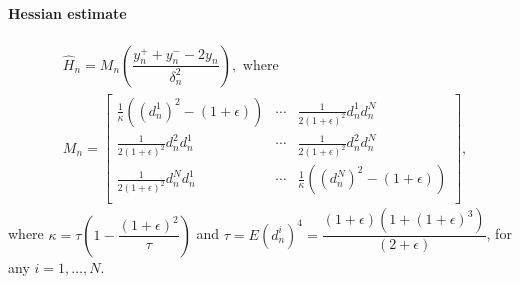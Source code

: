 \documentclass[letterpaper, 10 pt, conference]{ieeeconf}  %
\begin{document}
\paragraph{Hessian estimate}

\begin{align}
\label{eq:2rdsa-estimate-ber}
&\widehat H_n = M_n \left(\dfrac{y_n^+ + y_n^- - 2 y_n}{\delta_n^2}\right), \text{ where }\\
& M_n =
\left[
\begin{array}{ccc}
\frac{1}{\kappa}\left((d_n^1)^2\!-(1+\epsilon)\right) & \cdots & \frac{1}{2(1+\epsilon)^2}d_n^1 d_n^N\\
\frac{1}{2(1+\epsilon)^2}d_n^2 d_n^1  &  \cdots & \frac{1}{2(1+\epsilon)^2}d_n^2 d_n^N\\
\frac{1}{2(1+\epsilon)^2}d_n^N d_n^1 & \cdots &  \frac{1}{\kappa}\left((d_n^N)^2-(1+\epsilon)\right) \\
\end{array}
\right],\nonumber
\end{align}
where $\kappa = \tau \left(1- \dfrac{(1+\epsilon)^2}{\tau}\right)$ and $\tau = E (d_n^i)^4= \dfrac{(1+\epsilon)(1+(1+\epsilon)^3)}{(2+\epsilon)}$, for any $i=1,\ldots,N$. 
\end{document}
